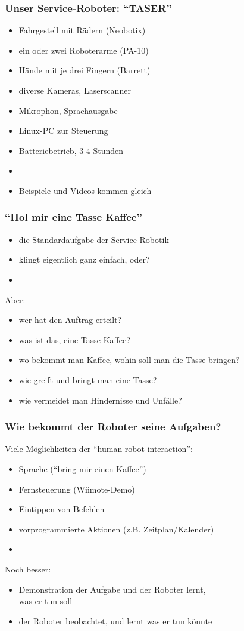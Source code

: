 \documentclass[t]{beamer}
\def\ii{\item[]}
\begin{document}
\begin{frame}
\frametitle{Unser Service-Roboter: "`TASER"'}
%
\begin{itemize}
\item Fahrgestell mit Rädern (Neobotix)
\item ein oder zwei Roboterarme (PA-10)
\item Hände mit je drei Fingern (Barrett)
\item diverse Kameras, Laserscanner
\item Mikrophon, Sprachausgabe
\item Linux-PC zur Steuerung
\item Batteriebetrieb, 3-4 Stunden
\ii
\item Beispiele und Videos kommen gleich 
\end{itemize}
\end{frame}



\begin{frame}
\frametitle{"`Hol mir eine Tasse Kaffee"'}
\begin{itemize}
\item die Standardaufgabe der Service-Robotik
\item klingt eigentlich ganz einfach, oder?
\item[]
\end{itemize}
Aber:
\begin{itemize}
\item wer hat den Auftrag erteilt?
\item was ist das, eine Tasse Kaffee?
\item wo bekommt man Kaffee, wohin soll man die Tasse bringen?
\item wie greift und bringt man eine Tasse?
\item wie vermeidet man Hindernisse und Unfälle?
\end{itemize}
\end{frame}


\begin{frame}
\frametitle{Wie bekommt der Roboter seine Aufgaben? }
Viele Möglichkeiten der "`human-robot interaction"':
\begin{itemize}
\item Sprache            \hfill ("`bring mir einen Kaffee"')
\item Fernsteuerung      \hfill (Wiimote-Demo)
\item Eintippen von Befehlen   
\item vorprogrammierte Aktionen \hfill (z.B. Zeitplan/Kalender)
\item[]
\end{itemize}
Noch besser:
\begin{itemize}
\item Demonstration der Aufgabe und der Roboter lernt,\\
      was er tun soll 
\item der Roboter beobachtet, und lernt was er tun könnte
\end{itemize}
\end{frame}
\end{document}
